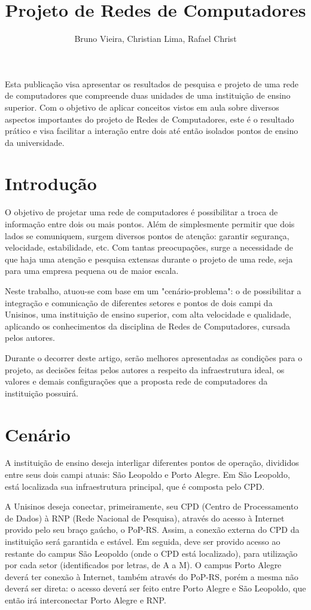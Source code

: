 \documentclass[12pt]{article}
\title{Projeto de Redes de Computadores}
\author{Bruno Vieira\inst{1}, Christian Lima\inst{1}, Rafael Christ\inst{1}}
\begin{document}
 

\maketitle
     
\begin{resumo} 
  Esta publicação visa apresentar os resultados de pesquisa e projeto de uma rede de computadores que compreende duas unidades de uma instituição de ensino superior. Com o objetivo de aplicar conceitos vistos em aula sobre diversos aspectos importantes do projeto de Redes de Computadores, este é o resultado prático e visa facilitar a interação entre dois até então isolados pontos de ensino da universidade.
\end{resumo}


\section{Introdução}
O objetivo de projetar uma rede de computadores é possibilitar a troca de informação entre dois ou mais pontos. Além de simplesmente permitir que dois lados se comuniquem, surgem diversos pontos de atenção: garantir segurança, velocidade, estabilidade, etc. Com tantas preocupações, surge a necessidade de que haja uma atenção e pesquisa extensas durante o projeto de uma rede, seja para uma empresa pequena ou de maior escala.

Neste trabalho, atuou-se com base em um "cenário-problema": o de possibilitar a integração e comunicação de diferentes setores e pontos de dois campi da Unisinos, uma instituição de ensino superior, com alta velocidade e qualidade, aplicando os conhecimentos da disciplina de Redes de Computadores, cursada pelos autores.

Durante o decorrer deste artigo, serão melhores apresentadas as condições para o projeto, as decisões feitas pelos autores a respeito da infraestrutura ideal, os valores e demais configurações que a proposta rede de computadores da instituição possuirá.

\section{Cenário} \label{sec:cenario}
A instituição de ensino deseja interligar diferentes pontos de operação, divididos entre seus dois campi atuais: São Leopoldo e Porto Alegre. Em São Leopoldo, está localizada sua infraestrutura principal, que é composta pelo CPD.

A Unisinos deseja conectar, primeiramente, seu CPD (Centro de Processamento de Dados) à RNP (Rede Nacional de Pesquisa), através do acesso à Internet provido pelo seu braço gaúcho, o PoP-RS. Assim, a conexão externa do CPD da instituição será garantida e estável. Em seguida, deve ser provido acesso ao restante do campus São Leopoldo (onde o CPD está localizado), para utilização por cada setor (identificados por letras, de A a M). O campus Porto Alegre deverá ter conexão à Internet, também através do PoP-RS, porém a mesma não deverá ser direta: o acesso deverá ser feito entre Porto Alegre e São Leopoldo, que então irá interconectar Porto Alegre e RNP.
\end{document}
